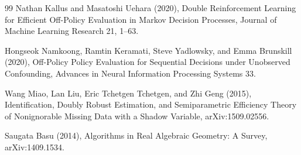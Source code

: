 \documentclass{article}
\begin{document}
\begin{thebibliography}{99}
   Nathan Kallus and Masatoshi Uehara (2020), Double Reinforcement Learning for Efficient Off-Policy Evaluation in Markov Decision Processes, Journal of Machine Learning Research 21, 1--63.

   Hongseok Namkoong, Ramtin Keramati, Steve Yadlowsky, and Emma Brunskill (2020), Off-Policy Policy Evaluation for Sequential Decisions under Unobserved Confounding, Advances in Neural Information Processing Systems 33.

   Wang Miao, Lan Liu, Eric Tchetgen Tchetgen, and Zhi Geng (2015), Identification, Doubly Robust Estimation, and Semiparametric Efficiency Theory of Nonignorable Missing Data with a Shadow Variable, arXiv:1509.02556.

   Saugata Basu (2014), Algorithms in Real Algebraic Geometry: A Survey, arXiv:1409.1534.

\end{thebibliography}
\end{document}
